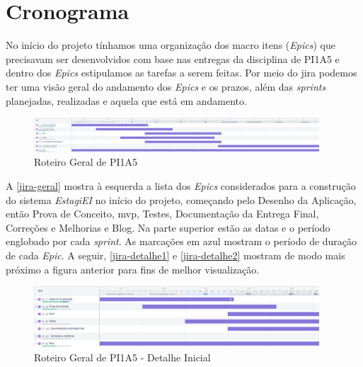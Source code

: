 \section{Cronograma}

No início do projeto tínhamos uma organização dos macro itens (\textit{Epics}) que precisavam ser desenvolvidos com base nas entregas da disciplina de PI1A5 e dentro dos \textit{Epics} estipulamos as tarefas a serem feitas. Por meio do \gls{jira} podemos ter uma visão geral do andamento dos \textit{Epics} e os prazos, além das \textit{\glspl{sprint}} planejadas, realizadas e aquela que está em andamento.

\begin{figure}[H]
	\centering
	\caption{\label{jira-geral}Roteiro Geral de PI1A5}
	\includegraphics[width=0.95\textwidth]{../imagens/cronograma-geral.png}
\end{figure}

A \autoref{jira-geral} mostra à esquerda a lista dos \textit{Epics} considerados para a construção do sistema \emph{EstagiEI} no início do projeto, começando pelo Desenho da Aplicação, então Prova de Conceito, \ac{mvp}, Testes, Documentação da Entrega Final, Correções e Melhorias e Blog. Na parte superior estão as datas e o período englobado por cada \textit{\gls{sprint}}. As marcações em azul mostram o período de duração de cada \textit{Epic}. A seguir, \autoref{jira-detalhe1} e \autoref{jira-detalhe2} mostram de modo mais próximo a figura anterior para fins de melhor visualização.

\begin{figure}[H]
	\centering
	\caption{\label{jira-detalhe1}Roteiro Geral de PI1A5 - Detalhe Inicial}
	\includegraphics[width=0.95\textwidth]{../imagens/cronograma-detalhe1.png}
\end{figure}

